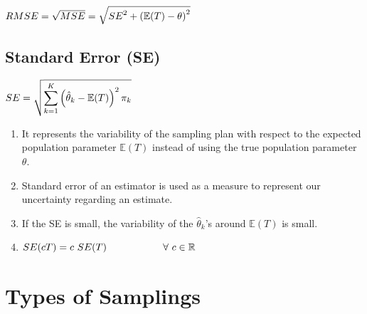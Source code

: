 \hfill
$
    RMSE
    = \sqrt{MSE}
    = \sqrt{{SE}^2 + \left(\mathbb{E}(T) - \theta\right)^2}
$
\hfill \cite{statistics/book/Statistics-for-Data-Scientists/Maurits-Kaptein}






\subsection{Standard Error (SE)}\label{Sampling Plans/Measures of closeness/Standard Error (SE)}


\hfill
$
    SE = \sqrt{
        \displaystyle\sum_{k=1}^{K} \left(
            \hat{\theta}_k - \mathbb{E}(T)
        \right)^2
        \pi_k
    }
$
\hfill \cite{statistics/book/Statistics-for-Data-Scientists/Maurits-Kaptein}


\begin{enumerate}
    \item It represents the variability of the sampling plan with respect to the expected population parameter $\mathbb{E}(T)$ instead of using the true population parameter $\theta$.
    \hfill \cite{statistics/book/Statistics-for-Data-Scientists/Maurits-Kaptein}

    \item Standard error of an estimator is used as a measure to represent our uncertainty regarding an estimate.
    \hfill \cite{statistics/book/Statistics-for-Data-Scientists/Maurits-Kaptein}

    \item If the SE is small, the variability of the $\hat{\theta}_k$’s around $\mathbb{E}(T)$ is small.
    \hfill \cite{statistics/book/Statistics-for-Data-Scientists/Maurits-Kaptein}

    \item $SE(cT ) = c\ SE(T) \hspace{2cm} \forall\  c \in \mathbb{R}$
    \hfill \cite{statistics/book/Statistics-for-Data-Scientists/Maurits-Kaptein}
\end{enumerate}








\section{Types of Samplings}

